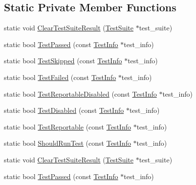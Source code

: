 \subsection*{Static Private Member Functions}
\begin{DoxyCompactItemize}
\item 
static void \mbox{\hyperlink{classtesting_1_1_test_suite_ac369ed8314da7fc6a322c57e5d5537ed}{Clear\+Test\+Suite\+Result}} (\mbox{\hyperlink{classtesting_1_1_test_suite}{Test\+Suite}} $\ast$test\+\_\+suite)
\item 
static bool \mbox{\hyperlink{classtesting_1_1_test_suite_a30cb6d26a98feda5c2af89a15abd3264}{Test\+Passed}} (const \mbox{\hyperlink{classtesting_1_1_test_info}{Test\+Info}} $\ast$test\+\_\+info)
\item 
static bool \mbox{\hyperlink{classtesting_1_1_test_suite_a0e162a1f49f40049a5b16fe989dc75e7}{Test\+Skipped}} (const \mbox{\hyperlink{classtesting_1_1_test_info}{Test\+Info}} $\ast$test\+\_\+info)
\item 
static bool \mbox{\hyperlink{classtesting_1_1_test_suite_ae4a91afa37c495d36bf30dd9d6cf0e9c}{Test\+Failed}} (const \mbox{\hyperlink{classtesting_1_1_test_info}{Test\+Info}} $\ast$test\+\_\+info)
\item 
static bool \mbox{\hyperlink{classtesting_1_1_test_suite_a6f9748db6f3382f65c747bcc2bc46b4c}{Test\+Reportable\+Disabled}} (const \mbox{\hyperlink{classtesting_1_1_test_info}{Test\+Info}} $\ast$test\+\_\+info)
\item 
static bool \mbox{\hyperlink{classtesting_1_1_test_suite_a01cf264bd705388df0778160ed433b93}{Test\+Disabled}} (const \mbox{\hyperlink{classtesting_1_1_test_info}{Test\+Info}} $\ast$test\+\_\+info)
\item 
static bool \mbox{\hyperlink{classtesting_1_1_test_suite_a939aba8925d609fb5d01464edad0b4d7}{Test\+Reportable}} (const \mbox{\hyperlink{classtesting_1_1_test_info}{Test\+Info}} $\ast$test\+\_\+info)
\item 
static bool \mbox{\hyperlink{classtesting_1_1_test_suite_ad6db30ec4e23a809f398dc2f50008541}{Should\+Run\+Test}} (const \mbox{\hyperlink{classtesting_1_1_test_info}{Test\+Info}} $\ast$test\+\_\+info)
\item 
static void \mbox{\hyperlink{classtesting_1_1_test_suite_ac369ed8314da7fc6a322c57e5d5537ed}{Clear\+Test\+Suite\+Result}} (\mbox{\hyperlink{classtesting_1_1_test_suite}{Test\+Suite}} $\ast$test\+\_\+suite)
\item 
static bool \mbox{\hyperlink{classtesting_1_1_test_suite_a30cb6d26a98feda5c2af89a15abd3264}{Test\+Passed}} (const \mbox{\hyperlink{classtesting_1_1_test_info}{Test\+Info}} $\ast$test\+\_\+info)

\end{DoxyCompactItemize}
